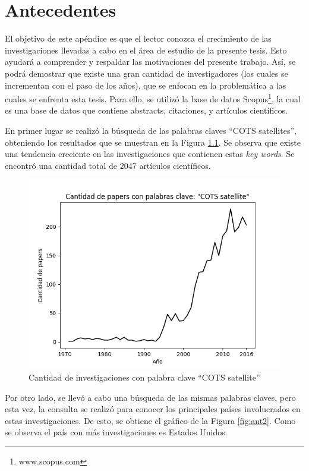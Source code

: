 \chapter{Antecedentes}\label{Appendix:Antecedentes}

El objetivo de este apéndice es que el lector conozca el crecimiento de las investigaciones
llevadas a cabo en el área de estudio de la presente tesis. Esto ayudará a comprender
y respaldar las motivaciones del presente trabajo.
Así, se podrá demostrar que existe una gran cantidad de investigadores
(los cuales se incrementan con el paso de los años), que se enfocan en la problemática a las cuales
se enfrenta esta tesis. Para ello, se utilizó la base de datos Scopus\footnote{www.scopus.com}, la cual es una
base de datos que contiene abstracts, citaciones, y artículos científicos. 

En primer lugar se realizó la búsqueda de las palabras claves ``COTS satellites'', obteniendo los resultados
que se muestran en la Figura \ref{fig:ant1}. Se observa que existe una tendencia creciente en las investigaciones
que contienen estas \textit{key words}.
Se encontró una cantidad total de 2047 artículos científicos. 

\begin{figure}[h!]
 \centering
 \includegraphics[scale=0.8]{images/Secciones/antecedentes/Cantidad_paper-COTS-Satellite.png}
  \caption{Cantidad de investigaciones con palabra clave ``COTS satellite''}
\label{fig:ant1}
\end{figure}

Por otro lado, se llevó a cabo una búsqueda de las mismas palabras claves, pero esta vez,
la consulta se realizó para conocer los principales países involucrados en estas investigaciones.
De esto, se obtiene el gráfico de la Figura \ref{fig:ant2}. Como se observa el país con más
investigaciones es Estados Unidos.

